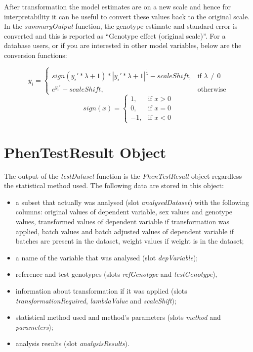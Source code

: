 \documentclass[12pt,a4paper]{article}
\begin{document}
After transformation the model estimates are on a new scale and hence for interpretability it can be useful to convert these values back to the original scale.  In the \textit{summaryOutput} function, the genotype estimate and standard error is converted and this is reported as “Genotype effect (original scale)”. 
For a database users, or if you are interested in other model variables, below are the conversion functions:

\begin{equation}
  y_i=\begin{cases}
    sign(y_i' * \lambda+1) * |y_i' * \lambda+1| ^\frac{1}{\lambda} - scaleShift, & \text{if $\lambda \neq 0$}\\
    e^{y_i'} - scaleShift, & \text{otherwise}
  \end{cases}
\end{equation}
\[
    sign(x)=\begin{cases}
    1, & \text{if $x > 0$}\\
    0, & \text{if $x = 0$}\\
    -1, & \text{if $x < 0$} 
  \end{cases}
\]

\section{PhenTestResult Object}
The output of the \textit{testDataset} function is the \textit{PhenTestResult} object regardless the statistical method used. The following data are stored in this object:
\begin{itemize}
\item a subset that actually was analysed (slot \textit{analysedDataset}) with the following columns: original values of dependent variable, sex values and genotype values, transformed values of dependent variable if transformation was applied, batch values and batch adjusted values of dependent variable if batches are present in the dataset, weight values if weight is in the dataset;
\item a name of the variable that was analysed (slot \textit{depVariable});
\item reference and test genotypes (slots \textit{refGenotype} and \textit{testGenotype}), 
\item information about transformation if it was applied (slots \textit{transformationRequired}, \textit{lambdaValue} and \textit{scaleShift});
\item statistical method used and method's parameters (slots \textit{method} and \textit{parameters});
\item analysis results (slot \textit{analysisResults}).
\end{itemize} 
\end{document}
